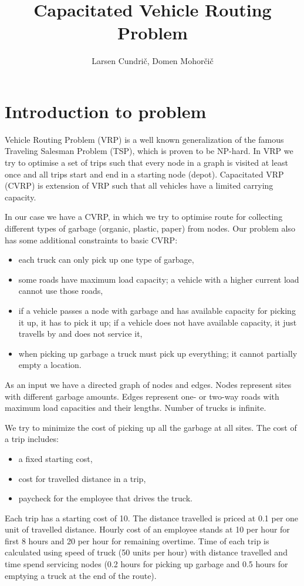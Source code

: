 \documentclass[a4paper, 12pt]{article}
\begin{document}
\title{Capacitated Vehicle Routing Problem}
\author{Larsen Cundrič, Domen Mohorčič}
\maketitle

\section{Introduction to problem}

Vehicle Routing Problem (VRP) is a well known generalization of the famous
Traveling Salesman Problem (TSP), which is proven to be NP-hard. In VRP we try
to optimise a set of trips such that every node in a graph is visited at least
once and all trips start and end in a starting node (depot).
Capacitated VRP (CVRP) is extension of VRP such that all vehicles have a
limited carrying capacity.

In our case we have a CVRP, in which we try to optimise route for collecting
different types of garbage (organic, plastic, paper) from nodes. Our problem
also has some additional constraints to basic CVRP:
\begin{itemize}
	\item each truck can only pick up one type of garbage,
	\item some roads have maximum load capacity; a vehicle with a higher
		current load cannot use those roads,
	\item if a vehicle passes a node with garbage and has available capacity
		for picking it up, it has to pick it up; if a vehicle does not have
		available capacity, it just travells by and does not service it,
	\item when picking up garbage a truck must pick up everything; it cannot
		partially empty a location.
\end{itemize}
As an input we have a directed graph of nodes and edges. Nodes represent sites
with different garbage amounts. Edges represent one- or two-way roads with
maximum load capacities and their lengths. Number of trucks is infinite.

We try to minimize the cost of picking up all the garbage at all sites. The
cost of a trip includes:
\begin{itemize}
	\item a fixed starting cost,
	\item cost for travelled distance in a trip,
	\item paycheck for the employee that drives the truck.
\end{itemize}
Each trip has a starting cost of 10. The distance travelled is priced at 0.1
per one unit of travelled distance. Hourly cost of an employee stands at 10 per
hour for first 8 hours and 20 per hour for remaining overtime. Time of each
trip is calculated using speed of truck (50 units per hour) with distance
travelled and time spend servicing nodes (0.2 hours for picking up garbage and
0.5 hours for emptying a truck at the end of the route).
\end{document}

